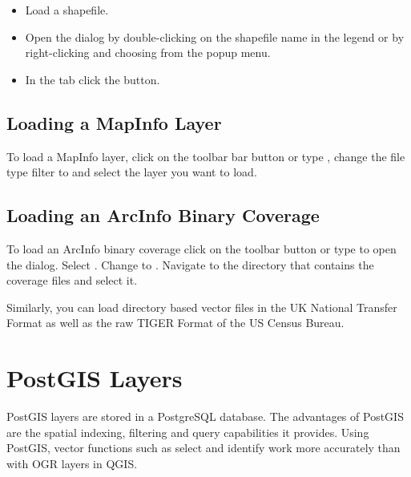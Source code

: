 \begin{itemize}[label=--]
\item Load a shapefile.
\item Open the  dialog by double-clicking on the
shapefile name in the legend or by right-clicking and choosing
 from the popup menu.
\item In the tab  click the  button.
\end{itemize}

\subsection{Loading a MapInfo Layer}

To load a MapInfo layer, click on the  toolbar bar button or type , change the
file type filter to  and select the layer you want to load.

\subsection{Loading an ArcInfo Binary Coverage}

To load an ArcInfo binary coverage click on the
 toolbar button or type
 to open the  dialog. Select
. Change to . 
Navigate to the directory that contains the coverage files and select it.

Similarly, you can load directory based  vector files in the UK National Transfer Format as well as the 
raw TIGER Format of the US Census Bureau.

\section{PostGIS Layers}
\label{label_postgis} 

PostGIS layers are stored in a PostgreSQL database. The advantages of PostGIS
are the spatial indexing, filtering and query capabilities it provides. Using PostGIS,
vector functions such as select and identify work more accurately than with
OGR layers in QGIS.

